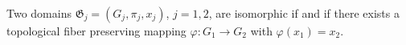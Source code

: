 Two domains $\mathfrak{G}_j = (G_j, \pi_j, x_j)$, $j = 1, 2$, are isomorphic if and if there exists a topological fiber preserving mapping $\varphi: G_1 \rightarrow G_2$ with $\varphi(x_1) = x_2$.
